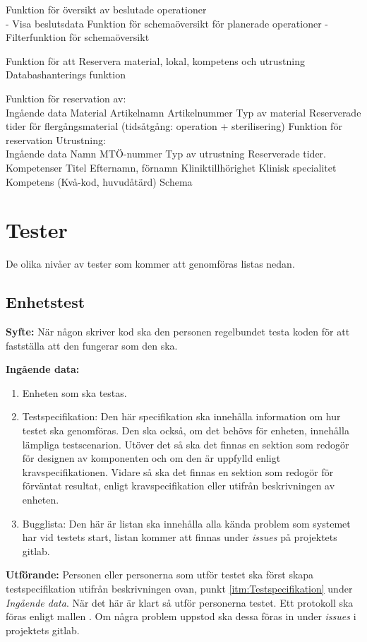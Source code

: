 \documentclass[a4paper,10pt]{article}
\begin{document}
Funktion för översikt av beslutade operationer \\
-	Visa beslutsdata
Funktion för schemaöversikt för planerade operationer
-	Filterfunktion för schemaöversikt 

Funktion för att Reservera material, lokal, kompetens och utrustning \\
Databashanterings funktion

Funktion för reservation av: \\
Ingående data 
	Material
	Artikelnamn
	Artikelnummer
	Typ av material
	Reserverade tider för flergångsmaterial (tidsåtgång: operation + sterilisering)
Funktion för reservation Utrustning: \\
Ingående data
	Namn
	MTÖ-nummer 
	Typ av utrustning
	Reserverade tider.
Kompetenser
Titel
Efternamn, förnamn
Kliniktillhörighet
Klinisk specialitet
Kompetens (Kvå-kod, huvudåtärd)
Schema


\section{Tester}
De olika nivåer av tester som kommer att genomföras listas nedan.
\subsection{Enhetstest}
  \textbf{Syfte:}
  När någon skriver kod ska den personen regelbundet testa koden för att fastställa att den fungerar som den ska.

  \textbf{Ingående data:}
        \begin{enumerate}
            \item Enheten som ska testas.
            \item \label{itm:Testspecifikation} Testspecifikation: Den här specifikation ska innehålla information om hur testet ska genomföras. Den ska också, om det behövs för enheten, innehålla lämpliga testscenarion. Utöver det så ska det finnas en sektion som redogör för designen av komponenten och om den är uppfylld enligt kravspecifikationen. Vidare så ska det finnas en sektion som redogör för förväntat resultat, enligt kravspecifikation eller utifrån beskrivningen av enheten.
            \item Bugglista: Den här är listan ska innehålla alla kända problem som systemet har vid testets start, listan kommer att finnas under \emph{issues} på projektets gitlab.
        \end{enumerate}
    \textbf{Utförande:} Personen eller personerna som utför testet ska först skapa testspecifikation utifrån beskrivningen ovan, punkt \ref{itm:Testspecifikation} under \emph{Ingående data}. När det här är klart så utför personerna testet. Ett protokoll ska föras enligt mallen . Om några problem uppstod ska dessa föras in under \emph{issues} i projektets gitlab.
\end{document}
